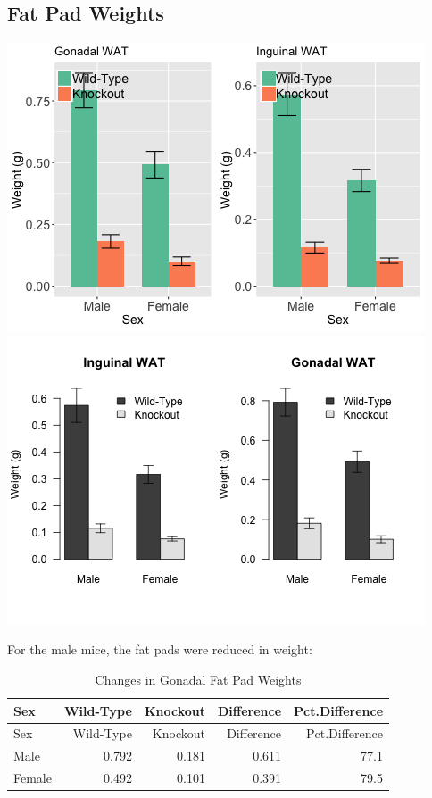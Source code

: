 \documentclass[]{article}
\begin{document}
\subsection{Fat Pad Weights}\label{fat-pad-weights}

\includegraphics{figures/wat-weights-1.png}
\includegraphics{figures/wat-weights-2.png}

For the male mice, the fat pads were reduced in weight:

\begin{longtable}[]{@{}lrrrr@{}}
\caption{Changes in Gonadal Fat Pad Weights}\tabularnewline
\toprule
Sex & Wild-Type & Knockout & Difference & Pct.Difference\tabularnewline
\midrule
\endfirsthead
\toprule
Sex & Wild-Type & Knockout & Difference & Pct.Difference\tabularnewline
\midrule
\endhead
Male & 0.792 & 0.181 & 0.611 & 77.1\tabularnewline
Female & 0.492 & 0.101 & 0.391 & 79.5\tabularnewline
\bottomrule
\end{longtable}
\end{document}
